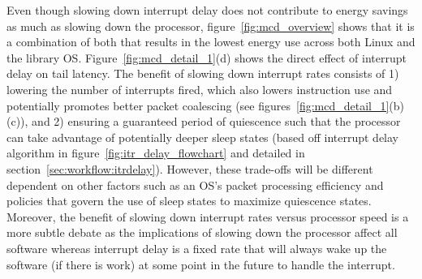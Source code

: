 Even though slowing down interrupt delay does not contribute to energy savings as much as slowing down the processor, figure~\ref{fig:mcd_overview} shows that it is  a combination of both that results in the lowest energy use across both Linux and the library OS.
Figure~\ref{fig:mcd_detail_1}(d) shows the direct effect of interrupt delay on tail latency.
The benefit of slowing down interrupt rates consists of
1) lowering the number of interrupts fired, which also lowers instruction use and potentially promotes better packet coalescing (see figures~\ref{fig:mcd_detail_1}(b)(c)), and
2) ensuring a guaranteed period of quiescence such that the processor can take advantage of potentially deeper sleep states (based off interrupt delay algorithm in figure~\ref{fig:itr_delay_flowchart} and detailed in section~\ref{sec:workflow:itrdelay}).
However, these trade-offs will be different dependent on other factors such as an OS's packet processing efficiency and policies that govern the use of sleep states to maximize quiescence states. Moreover, the benefit of slowing down interrupt rates versus processor speed is a more subtle debate as the implications of slowing down the processor affect all software whereas interrupt delay is a fixed rate that will always wake up the software (if there is work) at some point in the future to handle the interrupt. 






